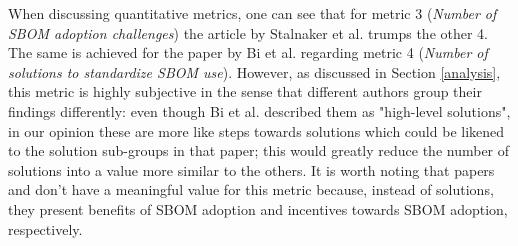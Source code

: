 \noindent When discussing quantitative metrics, one can see that for metric 3 (\emph{Number of SBOM adoption challenges}) the article by Stalnaker et al. \cite{article:software-bom} trumps the other 4. The same is achieved for the paper by Bi et al. \cite{article:sboms-issues-solutions} regarding metric 4 (\emph{Number of solutions to standardize SBOM use}). However, as discussed in Section \ref{analysis}, this metric is highly subjective in the sense that different authors group their findings differently: even though Bi et al. described them as "high-level solutions", in our opinion these are more like steps towards solutions which could be likened to the solution sub-groups in that paper; this would greatly reduce the number of solutions into a value more similar to the others. It is worth noting that papers \cite{article:sbom-required} and \cite{article:business-sbom} don't have a meaningful value for this metric because, instead of solutions, they present benefits of SBOM adoption and incentives towards SBOM adoption, respectively.